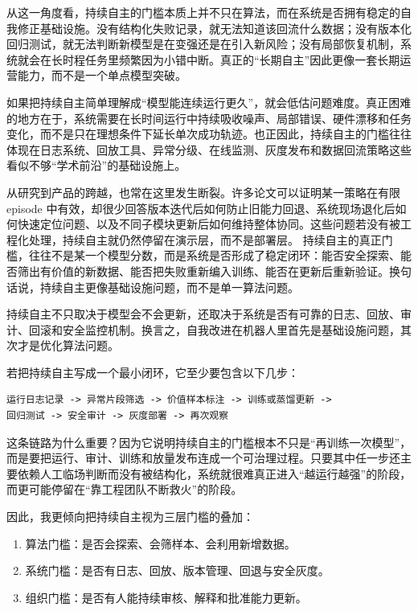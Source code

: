 从这一角度看，持续自主的门槛本质上并不只在算法，而在系统是否拥有稳定的自我修正基础设施。没有结构化失败记录，就无法知道该回流什么数据；没有版本化回归测试，就无法判断新模型是在变强还是在引入新风险；没有局部恢复机制，系统就会在长时程任务里频繁因为小错中断。真正的“长期自主”因此更像一套长期运营能力，而不是一个单点模型突破。

如果把持续自主简单理解成“模型能连续运行更久”，就会低估问题难度。真正困难的地方在于，系统需要在长时间运行中持续吸收噪声、局部错误、硬件漂移和任务变化，而不是只在理想条件下延长单次成功轨迹。也正因此，持续自主的门槛往往体现在日志系统、回放工具、异常分级、在线监测、灰度发布和数据回流策略这些看似不够“学术前沿”的基础设施上。

从研究到产品的跨越，也常在这里发生断裂。许多论文可以证明某一策略在有限 episode 中有效，却很少回答版本迭代后如何防止旧能力回退、系统现场退化后如何快速定位问题、以及不同子模块更新后如何维持整体协同。这些问题若没有被工程化处理，持续自主就仍然停留在演示层，而不是部署层。 持续自主的真正门槛，往往不是某一个模型分数，而是系统是否形成了稳定闭环：能否安全探索、能否筛出有价值的新数据、能否把失败重新编入训练、能否在更新后重新验证。换句话说，持续自主更像基础设施问题，而不是单一算法问题。

持续自主不只取决于模型会不会更新，还取决于系统是否有可靠的日志、回放、审计、回滚和安全监控机制。换言之，自我改进在机器人里首先是基础设施问题，其次才是优化算法问题。

若把持续自主写成一个最小闭环，它至少要包含以下几步：

\begin{lstlisting}
运行日志记录 -> 异常片段筛选 -> 价值样本标注 -> 训练或蒸馏更新 ->
回归测试 -> 安全审计 -> 灰度部署 -> 再次观察
\end{lstlisting}

这条链路为什么重要？因为它说明持续自主的门槛根本不只是“再训练一次模型”，而是要把运行、审计、训练和放量发布连成一个可治理过程。只要其中任一步还主要依赖人工临场判断而没有被结构化，系统就很难真正进入“越运行越强”的阶段，而更可能停留在“靠工程团队不断救火”的阶段。

因此，我更倾向把持续自主视为三层门槛的叠加：

\begin{enumerate}
\item 算法门槛：是否会探索、会筛样本、会利用新增数据。
\item 系统门槛：是否有日志、回放、版本管理、回退与安全灰度。
\item 组织门槛：是否有人能持续审核、解释和批准能力更新。
\end{enumerate}

